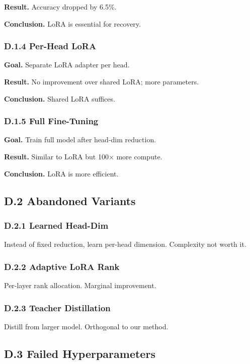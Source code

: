 \textbf{Result.} Accuracy dropped by 6.5\%.

\textbf{Conclusion.} LoRA is essential for recovery.

\subsubsection{D.1.4 Per-Head LoRA}

\textbf{Goal.} Separate LoRA adapter per head.

\textbf{Result.} No improvement over shared LoRA; more parameters.

\textbf{Conclusion.} Shared LoRA suffices.

\subsubsection{D.1.5 Full Fine-Tuning}

\textbf{Goal.} Train full model after head-dim reduction.

\textbf{Result.} Similar to LoRA but 100$\times$ more compute.

\textbf{Conclusion.} LoRA is more efficient.

\subsection{D.2 Abandoned Variants}

\subsubsection{D.2.1 Learned Head-Dim}

Instead of fixed reduction, learn per-head dimension. Complexity not worth it.

\subsubsection{D.2.2 Adaptive LoRA Rank}

Per-layer rank allocation. Marginal improvement.

\subsubsection{D.2.3 Teacher Distillation}

Distill from larger model. Orthogonal to our method.

\subsection{D.3 Failed Hyperparameters}

